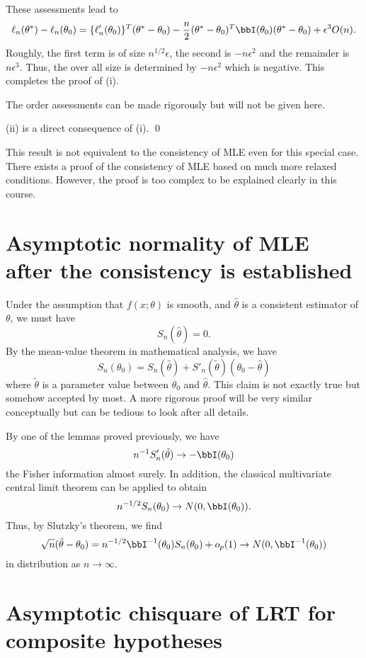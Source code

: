These assessments lead to 
\[
\ell_n(\theta^*) - \ell_n(\theta_0)
=
\{ \ell_n'(\theta_0)\}^T (\theta^* - \theta_0)
- \frac{n}{2} (\theta^* - \theta_0)^T \bbI (\theta_0) (\theta^* - \theta_0)
+ \epsilon^3 O(n).
\]
Roughly, the first term is of size $n^{1/2}\epsilon$, the second is $-n \epsilon^2$
and the remainder is $n \epsilon^3$. Thus, the over all size
is determined by $- n \epsilon^2$ which is negative.
This completes the proof of (i).

The order assessments can be made rigorously but will not be given here.

(ii) is a direct consequence of (i).
\qed


\vs
This result is not equivalent to the consistency of MLE even
for this special case. 
There exists a proof of the consistency of MLE based on
much more relaxed conditions. However, the proof 
is too complex to be explained clearly in this course.

\section{Asymptotic normality of MLE after the consistency is established}

Under the assumption that $f(x; \theta)$ is smooth, and
$\hat \theta$ is a consistent estimator of $\theta$, we must
have
\[
S_n(\hat \theta) = 0.
\]
By the mean-value theorem in mathematical analysis, we have
\[
S_n( \theta_0 ) 
= 
S_n(\hat \theta) + S'_n(\tilde \theta) (\theta_0 - \hat \theta)
\]
where $\tilde \theta$ is a parameter value between $\theta_0$
and $\hat \theta$. This claim is not exactly true but somehow accepted
by most. A more rigorous proof will be very similar conceptually but
can be tedious to look after all details.

By one of the lemmas proved previously, we have 
\[
n^{-1} S'_n(\tilde \theta) \to - \bbI(\theta_0)
\]
the Fisher information almost surely.
In addition, the classical multivariate central limit theorem can be applied
to obtain
\[
n^{-1/2} S_n( \theta_0 ) \to N(0, \bbI(\theta_0)).
\]
Thus, by Slutzky's theorem, we find
\[
\sqrt{n} (\hat \theta - \theta_0) 
= n^{-1/2} \bbI^{-1}(\theta_0) S_n( \theta_0 ) + o_p(1)
\to N(0, \bbI^{-1}(\theta_0))
\]
in distribution as $n \to \infty$.


\section{Asymptotic chisquare of LRT for composite hypotheses}

